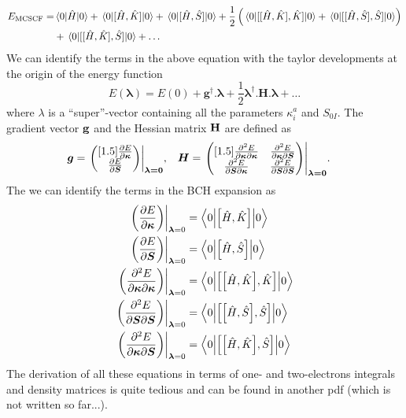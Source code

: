 \documentclass[11pt,a4paper]{article}
\newcommand{\hH}{\Hat{H}} %
\newcommand{\hK}{\Hat{K}} %
\newcommand{\hS}{\Hat{S}}
\newcommand{\com}[2]{\mleft[#1,#2 \mright]}
\begin{document}
\begin{equation}
  \label{eq:MCSCF_NRJ_BCH}
  \begin{split}
    E_{\text{MCSCF}} = &\mel{0}{\hH}{0} + \mel{0}{[\hH,\hK]}{0} + \mel{0}{[\hH,\hS]}{0} + \frac{1}{2} \left(\mel{0}{[[\hH,\hK],\hK]}{0} + \mel{0}{[[\hH,\hS],\hS]}{0}\right) \\
      &+ \mel{0}{[[\hH,\hK],\hS]}{0} + \dots
  \end{split}
\end{equation}
We can identify the terms in the above equation with the taylor developments at the origin of the energy function
\begin{equation}
  \label{eq:MCSCF_NRJ_Taylor}
  E(\bm{\lambda}) = E(0) + \boldsymbol{g}^\dagger.\bm{\lambda} + \frac{1}{2} \bm{\lambda}^\dagger.\boldsymbol{H}.\bm{\lambda} + \dots
\end{equation}
where $\lambda$ is a ``super''-vector containing all the parameters $\kappa_i^a$ and $S_{0I}$. The gradient vector $\vb{g}$ and the Hessian matrix $\vb{H}$ are defined as
\begin{align}
  \bm{g} &= \evalat*{\begin{pmatrix}[1.5]\pdv{E}{\bm{\kappa}} \\ \pdv{E}{\bm{S}} \end{pmatrix}}{\bm{\lambda=0}},
         &
           \bm{H} &= \evalat*{\begin{pmatrix}[1.5]\pdv{E}{\bm{\kappa}}{\bm{\kappa}} & \pdv{E}{\bm{\kappa}}{\bm{S}} \\ \pdv{E}{\bm{S}}{\bm{\kappa}} & \pdv{E}{\bm{S}}{\bm{S}} \end{pmatrix}}{\bm{\lambda=0}}.
\end{align}
The we can identify the terms in the BCH expansion as
\begin{align}
  \evalat*{\mleft(\pdv{E}{\bm{\kappa}}\mright)}{\bm{\lambda}=0} &= \mel**{0}{\com{\hH}{\hK}}{0} \\
  \evalat*{\mleft(\pdv{E}{\bm{S}}\mright)}{\bm{\lambda}=0} &= \mel**{0}{\com{\hH}{\hS}}{0} \\
  \evalat*{\mleft(\pdv{E}{\bm{\kappa}}{\bm{\kappa}}\mright)}{\bm{\lambda}=0} &= \mel**{0}{\com{\com{\hH}{\hK}}{\hK}}{0} \\
  \evalat*{\mleft(\pdv{E}{\bm{S}}{\bm{S}}\mright)}{\bm{\lambda}=0} &= \mel**{0}{\com{\com{\hH}{\hS}}{\hS}}{0} \\
  \evalat*{\mleft(\pdv{E}{\bm{\kappa}}{\bm{S}}\mright)}{\bm{\lambda}=0} &= \mel**{0}{\com{\com{\hH}{\hK}}{\hS}}{0}
\end{align}
The derivation of all these equations in terms of one- and two-electrons integrals and density matrices is quite tedious and can be found in another pdf (which is not written so far...).
\end{document}
